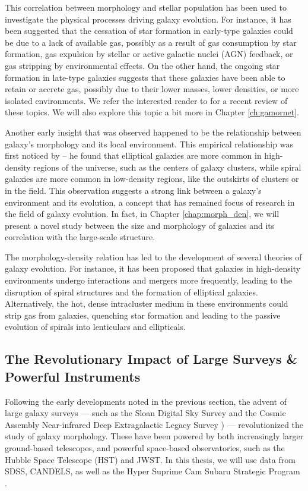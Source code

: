 This correlation between morphology and stellar population has been used to investigate the physical processes driving galaxy evolution. For instance, it has been suggested that the cessation of star formation in early-type galaxies could be due to a lack of available gas, possibly as a result of gas consumption by star formation, gas expulsion by stellar or active galactic nuclei (AGN) feedback, or gas stripping by environmental effects. On the other hand, the ongoing star formation in late-type galaxies suggests that these galaxies have been able to retain or accrete gas, possibly due to their lower masses, lower densities, or more isolated environments. We refer the interested reader to \citet{morph_review} for a recent review of these topics. We will also explore this topic a bit more in Chapter \ref{ch:gamornet}.

Another early insight that was observed happened to be the relationship between galaxy's morphology and its local environment. This empirical relationship was first noticed by \citet{dressler_84} -- he found that elliptical galaxies are more common in high-density regions of the universe, such as the centers of galaxy clusters, while spiral galaxies are more common in low-density regions, like the outskirts of clusters or in the field. This observation suggests a strong link between a galaxy's environment and its evolution, a concept that has remained focus of research in the field of galaxy evolution. In fact, in Chapter \ref{chap:morph_den}, we will present a novel study between the size and morphology of galaxies and its correlation with the large-scale structure. 

The morphology-density relation has led to the development of several theories of galaxy evolution. For instance, it has been proposed that galaxies in high-density environments undergo interactions and mergers more frequently, leading to the disruption of spiral structures and the formation of elliptical galaxies. Alternatively, the hot, dense intracluster medium in these environments could strip gas from galaxies, quenching star formation and leading to the passive evolution of spirals into lenticulars and ellipticals.

\subsection{The Revolutionary Impact of Large Surveys \& Powerful Instruments} \label{sec_intro:large_surveys}

Following the early developments noted in the previous section, the advent of large galaxy surveys --- such as the Sloan Digital Sky Survey \citep[SDSS; ][]{sdss_tech_summary} and the Cosmic Assembly Near-infrared Deep Extragalactic Legacy Survey \citep[CANDELS; ][]{candels_1}) --- revolutionized the study of galaxy morphology. These have been powered by both increasingly larger ground-based telescopes, and powerful space-based observatories, such as the Hubble Space Telescope (HST) and JWST. In this thesis, we will use data from SDSS, CANDELS, as well as the Hyper Suprime Cam Subaru Strategic Program \citep[HSC-SSP; ][]{hsc_design}. 

